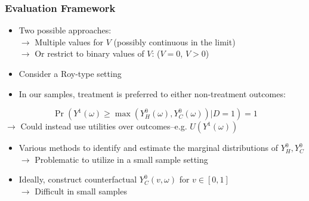 \documentclass[static]{JJH-Beamer}
\begin{document}
\begin{frame}
\frametitle{Evaluation Framework}
\begin{itemize}
	\item Two possible approaches: \\
		$\rightarrow$ Multiple values for $V$ (possibly continuous in the limit) \\
		$\rightarrow$ Or restrict to binary values of $V$:  ($V=0$, $V>0$)
	\item Consider a Roy-type setting
	\item In our samples, treatment is preferred to either non-treatment outcomes: 
\end{itemize}

	\begin{equation}
		\Pr \left( Y^1 (\omega)  \geq \max \left( Y_H^0  (\omega) , Y_C^0  (\omega)\right)  | D = 1 \right) = 1
	\end{equation}
$\rightarrow$ Could instead use utilities over outcomes--e.g. $U \left( Y^1(\omega) \right)$
\begin{itemize}
	\item Various methods to identify and estimate the marginal distributions of $Y_H^0, Y_C^0$ \\
	$\rightarrow$ Problematic to utilize in a small sample setting 
	\item Ideally, construct counterfactual $Y_C^0 \left( v, \omega \right)$ for $v \in [0,1]$ \\
	$\rightarrow$ Difficult in small samples
\end{itemize}
\end{frame}
\end{document}
